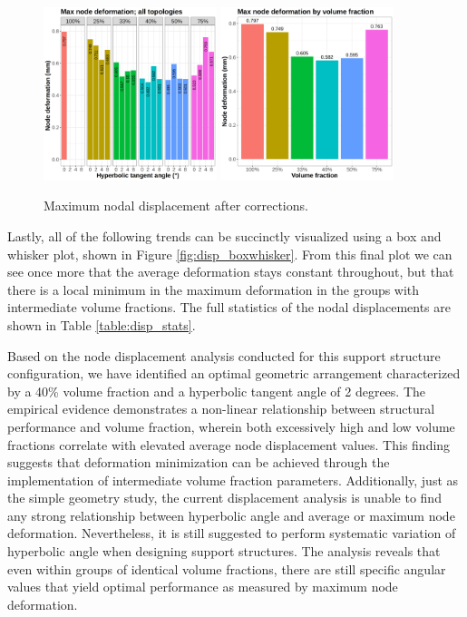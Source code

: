 \documentclass[../main.tex]{subfiles}
\begin{document}
\begin{figure}[h!]
  \includegraphics[width=0.45\textwidth]{images/results/plots/femoral/displacement/femoral_max.png}
  \hfill
  \includegraphics[width=0.45\textwidth]{images/results/plots/femoral/displacement/femoral_max_group.png}
  \caption{Maximum nodal displacement after corrections.}
  \label{fig:disp_max_correct}
\end{figure}

Lastly, all of the following trends can be succinctly visualized using a box and whisker plot, shown in Figure \ref{fig:disp_boxwhisker}. From this final plot we can see once more that the average deformation stays constant throughout, but that there is a local minimum in the maximum deformation in the groups with intermediate volume fractions. The full statistics of the nodal displacements are shown in Table \ref{table:disp_stats}.

Based on the node displacement analysis conducted for this support structure configuration, we have identified an optimal geometric arrangement characterized by a 40\% volume fraction and a hyperbolic tangent angle of 2 degrees. The empirical evidence demonstrates a non-linear relationship between structural performance and volume fraction, wherein both excessively high and low volume fractions correlate with elevated average node displacement values. This finding suggests that deformation minimization can be achieved through the implementation of intermediate volume fraction parameters. Additionally, just as the simple geometry study, the current displacement analysis is unable to find any strong relationship between hyperbolic angle and average or maximum node deformation. Nevertheless, it is still suggested to perform systematic variation of hyperbolic angle when designing support structures. The analysis reveals that even within groups of identical volume fractions, there are still specific angular values that yield optimal performance as measured by maximum node deformation.
\end{document}
